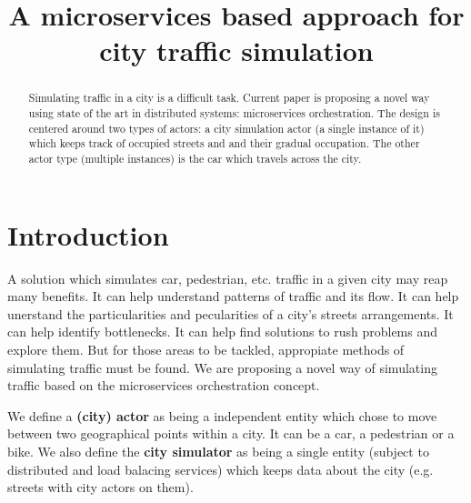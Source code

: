 \documentclass[conference]{IEEEtran}
\begin{document}
\title{A microservices based approach for city traffic simulation}

\author{
\and
{}
}

\maketitle

\begin{abstract}

Simulating traffic in a city is a difficult task. Current paper is proposing a novel way using state of the art in distributed systems: microservices orchestration. The design is centered around two types of actors: a city simulation actor (a single instance of it) which keeps track of occupied streets and and their gradual occupation. The other actor type (multiple instances) is the car which travels across the city.

\end{abstract}

\section{Introduction}

A solution which simulates car, pedestrian, etc. traffic in a given city may reap many benefits. It can help understand patterns of traffic and its flow. It can help unerstand the particularities and pecularities of a city's streets arrangements. It can help identify bottlenecks. It can help find solutions to rush problems and explore them. But for those areas to be tackled, appropiate methods of simulating traffic must be found. We are proposing a novel way of simulating traffic based on the microservices orchestration concept.

We define a \textbf{(city) actor} as being a independent entity which chose to move between two geographical points within a city. It can be a car, a pedestrian or a bike. We also define the \textbf{city simulator} as being a single entity (subject to distributed and load balacing services) which keeps data about the city (e.g. streets with city actors on them).
\end{document}
